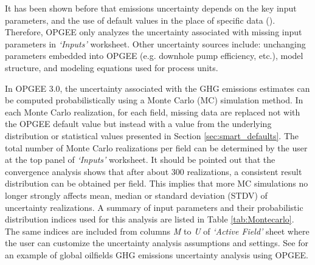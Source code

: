 \documentclass[11pt]{report}
\newcommand{\sheet}[1]{\textit{`{#1}'}}
\begin{document}
It has been shown before that emissions uncertainty depends on the key input parameters, and the use of default values in the place of specific data (\cite{brandt2014uncertainty,vafi2014uncertainty}). Therefore, OPGEE only analyzes the uncertainty associated with missing input parameters in \sheet{Inputs} worksheet. Other uncertainty sources include: unchanging parameters embedded into OPGEE (e.g. downhole pump efficiency, etc.), model structure, and modeling equations used for process units.

In OPGEE 3.0, the uncertainty associated with the GHG emissions estimates can be computed probabilistically using a Monte Carlo (MC) simulation method. In each Monte Carlo realization, for each field, missing data are replaced not with the OPGEE default value but instead with a value from the underlying distribution or statistical values presented in Section \ref{sec:smart_defaults}. The total number of Monte Carlo realizations per field can be determined by the user at the top panel of \sheet{Inputs} worksheet. It should be pointed out that the convergence analysis shows that after about 300 realizations, a consistent result distribution can be obtained per field. This implies that more MC simulations no longer strongly affects mean, median or standard deviation (STDV) of uncertainty realizations. 
A summary of input parameters and their probabilistic distribution indices used for this analysis are listed in Table \ref{tab:Montecarlo}. The same indices are included from columns \emph{M} to \emph{U} of \sheet{Active Field} sheet where the user can customize the uncertainty analysis assumptions and settings. See \cite{masnadi2018global} for an example of global oilfields GHG emissions uncertainty analysis using OPGEE.
\end{document}
